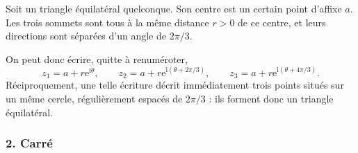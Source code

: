 \documentclass[11pt,a4paper]{article}
\newcommand{\ii}{\mathrm{i}}
\newcommand{\e}{\mathrm{e}}
\begin{document}
\begin{enumerate}[label=\textbf{D1.\arabic*.}]
    Soit un triangle équilatéral quelconque. Son centre est un certain point d’affixe \(a\). Les trois sommets sont tous à la même distance \(r>0\) de ce centre, et leurs directions sont séparées d’un angle de \(2\pi/3\).

    On peut donc écrire, quitte à renuméroter,
    \[
    z_1=a+r\e^{\ii\theta},\qquad
    z_2=a+r\e^{\ii(\theta+2\pi/3)},\qquad
    z_3=a+r\e^{\ii(\theta+4\pi/3)}.
    \]
    Réciproquement, une telle écriture décrit immédiatement trois points situés sur un même cercle, régulièrement espacés de \(2\pi/3\) : ils forment donc un triangle équilatéral.

\end{enumerate}

\subsubsection*{2. Carré}
\end{document}
